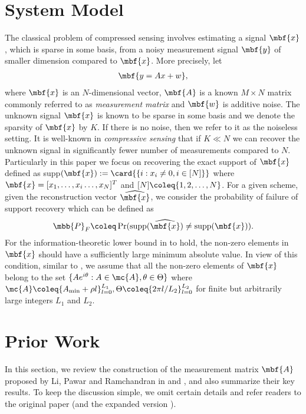 \documentclass[conference]{IEEEtran}
\begin{document}
\section{System Model}
The classical problem of compressed sensing involves estimating a signal $\mbf{x}$, which is sparse in some basis, from a noisy measurement signal $\mbf{y}$ of smaller dimension compared to $\mbf{x}$. More precisely, let
\begin{align*}
\mbf{y=Ax+w},
\end{align*}
where $\mbf{x}$ is an $N$-dimensional vector, $\mbf{A}$ is a known $M \times N$ matrix commonly referred to as \emph{measurement matrix} and $\mbf{w}$ is additive noise. The unknown signal $\mbf{x}$ is known to be sparse in some basis and we denote the sparsity of $\mbf{x}$ by $K$. If there is no noise, then we refer to it as the noiseless setting. It is well-known in \emph{compressive sensing} that if $K \ll N$ we can recover the unknown signal in significantly fewer number of measurements compared to $N$.  Particularly in this paper we focus on recovering the exact support of $\mbf{x}$ defined as supp$(\mbf{x}):=\card{\{i:x_i\neq 0, i\in[N]\}}$ where $\mbf{x}=[x_1,\ldots , x_i \ldots ,x_N]^{T}$ and $[N]\coleq\{1,2,\ldots ,N\}$. For a given scheme, given the reconstruction vector $\widehat{\mbf{x}}$, we consider the probability of failure of support recovery which can be defined as
\begin{align*}
\mbb{P}_{F}\coleq\Pr(\text{supp}(\widehat{\mbf{x}})\neq \text{supp}(\mbf{x})).
\end{align*}
For the information-theoretic lower bound in \cite{wainwright2009information} to hold, the non-zero elements in $\mbf{x}$ should have a sufficiently large minimum absolute value. In view of this condition, similar to \cite{li2015subisit,li2015subdraft}, 
 we assume that all the non-zero elements of $\mbf{x}$ belong to the set $\{Ae^{i\theta}:A\in\mc{A},\theta\in\Theta\}$ where $\mc{A}\coleq \{A_{\text{min}}+\rho l\}^{L_1}_{l=0},\Theta\coleq\{2\pi l/L_2\}_{l=0}^{L_2}$ for finite but arbitrarily large integers $L_1$ and $L_2$.
\section{Prior Work }\label{Sec:Review}
In this section, we review the construction of the measurement matrix $\mbf{A}$ proposed by Li, Pawar and Ramchandran in \cite{li2015subisit} and \cite{li2015subdraft}, and also summarize their key results. To keep the discussion simple, we omit certain details and refer readers to the original paper \cite{li2015subisit} (and the expanded version  \cite{li2015subdraft}).
\end{document}
